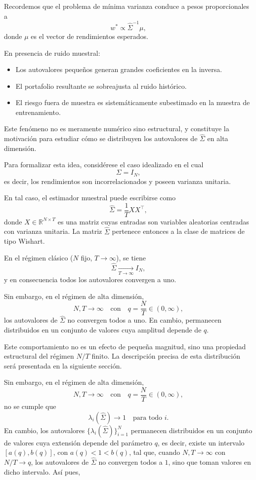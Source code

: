 \documentclass[letterpaper,12pt,oneside]{book}
\begin{document}
Recordemos que el problema de mínima varianza conduce a pesos proporcionales a
\[
w^* \propto \widehat{\Sigma}^{-1} \mu,
\]
donde $\mu$ es el vector de rendimientos esperados.

En presencia de ruido muestral:

\begin{itemize}
    \item Los autovalores pequeños generan grandes coeficientes en la inversa.
    
    \item El portafolio resultante se sobreajusta al ruido histórico.
    
    \item El riesgo fuera de muestra es sistemáticamente subestimado en la muestra de entrenamiento.
\end{itemize}

Este fenómeno no es meramente numérico sino estructural, y constituye la motivación para estudiar cómo se distribuyen los autovalores de $\widehat{\Sigma}$ en alta dimensión.

Para formalizar esta idea, considérese el caso idealizado en el cual
\[
\Sigma = I_N,
\]
es decir, los rendimientos son incorrelacionados y poseen varianza unitaria.

En tal caso, el estimador muestral puede escribirse como
\[
\widehat{\Sigma} = \frac{1}{T} X X^\top,
\]
donde $X \in \mathbb{R}^{N \times T}$ es una matriz cuyas entradas son variables aleatorias centradas con varianza unitaria. 
La matriz $\widehat{\Sigma}$ pertenece entonces a la clase de matrices de tipo Wishart.

En el régimen clásico ($N$ fijo, $T \to \infty$), se tiene
\[
\widehat{\Sigma} \xrightarrow[T \to \infty]{} I_N,
\]
y en consecuencia todos los autovalores convergen a uno.

Sin embargo, en el régimen de alta dimensión,
\[
N,T \to \infty \quad \text{con} \quad q = \frac{N}{T} \in (0,\infty),
\]
los autovalores de $\widehat{\Sigma}$ no convergen todos a uno.
En cambio, permanecen distribuidos en un conjunto de valores cuya amplitud depende de $q$.

Este comportamiento no es un efecto de pequeña magnitud, sino una propiedad estructural del régimen $N/T$ finito. 
La descripción precisa de esta distribución será presentada en la siguiente sección. 

Sin embargo, en el régimen de alta dimensión,
\[
N,T \to \infty \quad \text{con} \quad q = \frac{N}{T} \in (0,\infty),
\]
no se cumple que
\[
\lambda_i(\widehat{\Sigma}) \to 1 \quad \text{para todo } i.
\]
En cambio, los autovalores $\{\lambda_i(\widehat{\Sigma})\}_{i=1}^N$
permanecen distribuidos en un conjunto de valores cuya extensión depende del parámetro $q$, es decir, existe un intervalo $[a(q), b(q)]$, con $a(q) < 1 < b(q)$,
tal que, cuando $N,T \to \infty$ con $N/T \to q$, los autovalores de $\widehat{\Sigma}$ no convergen todos a $1$, sino que toman valores en dicho intervalo. Así pues, 
\end{document}
